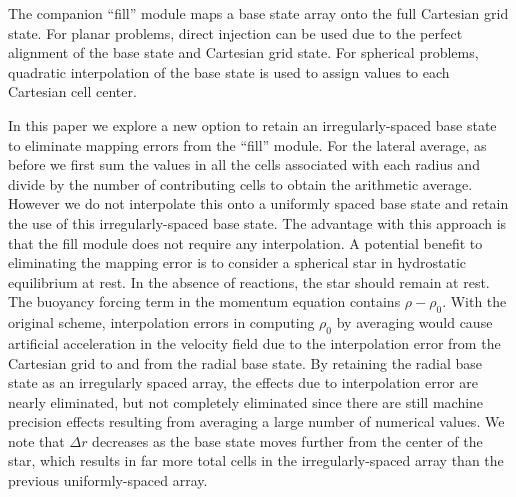 \documentclass{aastex62}
\begin{document}
The companion ``fill'' module maps a base state array onto the full Cartesian grid state.
For planar problems, direct injection can be used due to the perfect alignment of the base state and Cartesian grid state.
For spherical problems, quadratic interpolation of the base state is used to assign values to each Cartesian cell center.

In this paper we explore a new option to retain an irregularly-spaced base state to eliminate mapping errors from the ``fill'' module.
For the lateral average, as before we first sum the values in all the cells associated with each radius and divide
by the number of contributing cells to obtain the arithmetic average.  However we do not interpolate this onto a uniformly spaced
base state and retain the use of this irregularly-spaced base state.
The advantage with this approach is that the fill module does not require any interpolation.
A potential benefit to eliminating the mapping error is to consider a spherical star in hydrostatic equilibrium at rest.
In the absence of reactions, the star should remain at rest.
The buoyancy forcing term in the momentum equation contains $\rho-\rho_0$.  With the original scheme, interpolation errors 
in computing $\rho_0$ by averaging would cause artificial acceleration in the velocity field due to the interpolation error 
from the Cartesian grid to and from the radial base state.  By retaining the radial base state as an irregularly spaced 
array, the effects due to interpolation error are nearly eliminated, but not completely eliminated since there are still 
machine precision effects resulting from averaging a large number of numerical values.
We note that $\Delta r$ decreases as the base state moves further from the center of the star, 
which results in far more total cells in the irregularly-spaced array than the previous uniformly-spaced array. 
\end{document}

